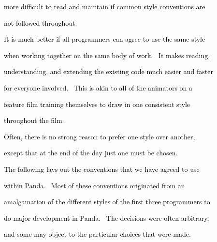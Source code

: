 \documentclass[a4paper]{article}
\newcommand\textstyleOOoComputerKeyWord[1]{\textrm{\textcolor[rgb]{0.0,0.0,0.5019608}{#1}}}
\begin{document}
{\color{black}
\textstyleOOoComputerKeyWord{\textcolor{black}{more difficult to read and maintain if common style conventions are}}}

{\color{black}
\textstyleOOoComputerKeyWord{\textcolor{black}{not followed throughout.}}}


\bigskip

{\color{black}
\textstyleOOoComputerKeyWord{\textcolor{black}{It is much better if all programmers can agree to use the same style}}}

{\color{black}
\textstyleOOoComputerKeyWord{\textcolor{black}{when working together on the same body of work. \ It makes reading,}}}

{\color{black}
\textstyleOOoComputerKeyWord{\textcolor{black}{understanding, and extending the existing code much easier and faster}}}

{\color{black}
\textstyleOOoComputerKeyWord{\textcolor{black}{for everyone involved. \ This is akin to all of the animators on a}}}

{\color{black}
\textstyleOOoComputerKeyWord{\textcolor{black}{feature film training themselves to draw in one consistent style}}}

{\color{black}
\textstyleOOoComputerKeyWord{\textcolor{black}{throughout the film.}}}


\bigskip


\bigskip

{\color{black}
\textstyleOOoComputerKeyWord{\textcolor{black}{Often, there is no strong reason to prefer one style over another,}}}

{\color{black}
\textstyleOOoComputerKeyWord{\textcolor{black}{except that at the end of the day just one must be chosen.}}}


\bigskip


\bigskip

{\color{black}
\textstyleOOoComputerKeyWord{\textcolor{black}{The following lays out the conventions that we have agreed to use}}}

{\color{black}
\textstyleOOoComputerKeyWord{\textcolor{black}{within Panda. \ Most of these conventions originated from an}}}

{\color{black}
\textstyleOOoComputerKeyWord{\textcolor{black}{amalgamation of the different styles of the first three programmers to}}}

{\color{black}
\textstyleOOoComputerKeyWord{\textcolor{black}{do major development in Panda. \ The decisions were often arbitrary,}}}

{\color{black}
\textstyleOOoComputerKeyWord{\textcolor{black}{and some may object to the particular choices that were made.}}}
\end{document}
